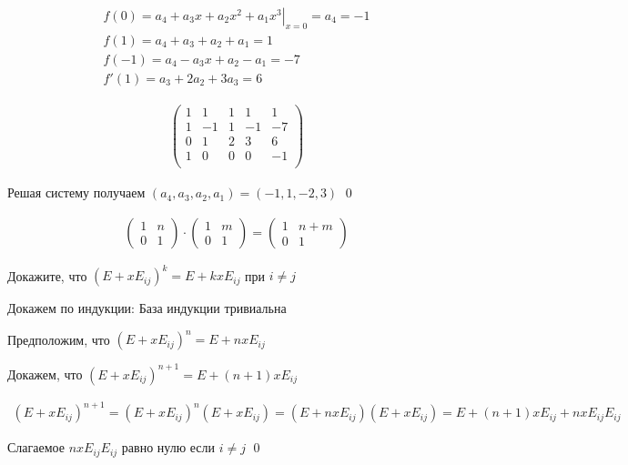 \begin{sol}
\begin{gather*}
   \left. f(0) = a_4 + a_3 x + a_2 x^2 + a_1 x^3 \right\vert_{x = 0} = a_4 = -1 \\
   f(1) = a_4 + a_3 + a_2 + a_1 = 1 \\
   f(-1) = a_4 - a_3 x + a_2 -  a_1 = -7 \\
   f'(1) =  a_3 + 2 a_2 + 3 a_3  = 6
\end{gather*}

\begin{gather*}
    \left(
    \begin{array}{cccc|c}
     1 & 1 & 1 & 1 & 1 \\
     1 & -1 & 1 & -1 & -7 \\
     0 & 1 & 2 & 3 & 6 \\
     1 & 0 & 0 & 0 & -1 \\
    \end{array}
    \right)
\end{gather*}

Решая систему получаем $\left(a_4, a_3, a_2, a_1\right) = \left(-1, 1, -2, 3\right)$
\qed
\end{sol}

\begin{nb}

\begin{gather*}
    \left(
    \begin{array}{cc}
    1 & n \\
    0 & 1
    \end{array}
    \right)
    \cdot
    \left(
    \begin{array}{cc}
    1 & m \\
    0 & 1
    \end{array}
    \right) =
    \left(
    \begin{array}{cc}
    1 & n + m \\
    0 & 1
    \end{array}
    \right)
\end{gather*}
\end{nb}

\begin{prb}
Докажите, что $\left(E +  x E_{ij}\right)^k = E +  k x E_{ij}$ при $i \neq j$
\end{prb}

\begin{sol}
Докажем по индукции:
База индукции тривиальна

Предположим, что $\left(E +  x E_{ij}\right)^n = E +  n x E_{ij}$

Докажем, что $\left(E +  x E_{ij}\right)^{n + 1} = E +  (n + 1 )x E_{ij}$

\begin{gather*}
    \left(E +  x E_{ij}\right)^{n + 1} = \left(E +  x E_{ij}\right)^{n} \left(E +  x E_{ij}\right) = \left(E +  n x E_{ij}\right) \left(E +  x E_{ij}\right) = E + (n + 1) x E_{ij} + nx E_{ij}E_{ij} 
\end{gather*}

Слагаемое $nx E_{ij}E_{ij}$ равно нулю если $i \neq j$ \qed

\end{sol}

